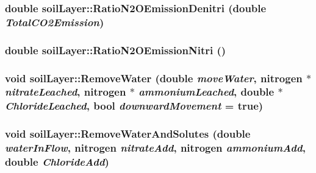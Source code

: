 \hypertarget{classsoil_layer_affc819f2895a9db557edc95966e56473}{
\subsubsection[{RatioN2OEmissionDenitri}]{\setlength{\rightskip}{0pt plus 5cm}double soilLayer::RatioN2OEmissionDenitri (double {\em TotalCO2Emission})}}
\label{classsoil_layer_affc819f2895a9db557edc95966e56473}
\hypertarget{classsoil_layer_a00af828149bbb4f4f7e1544bf75a33e3}{
\subsubsection[{RatioN2OEmissionNitri}]{\setlength{\rightskip}{0pt plus 5cm}double soilLayer::RatioN2OEmissionNitri ()}}
\label{classsoil_layer_a00af828149bbb4f4f7e1544bf75a33e3}
\hypertarget{classsoil_layer_a4043ef6ea471e4645efd82054aa78877}{
\subsubsection[{RemoveWater}]{\setlength{\rightskip}{0pt plus 5cm}void soilLayer::RemoveWater (double {\em moveWater}, \/  {\bf nitrogen} $\ast$ {\em nitrateLeached}, \/  {\bf nitrogen} $\ast$ {\em ammoniumLeached}, \/  double $\ast$ {\em ChlorideLeached}, \/  bool {\em downwardMovement} = {\ttfamily true})}}
\label{classsoil_layer_a4043ef6ea471e4645efd82054aa78877}
\hypertarget{classsoil_layer_aa3c2588bb518594ccb63a7004bc823d4}{
\subsubsection[{RemoveWaterAndSolutes}]{\setlength{\rightskip}{0pt plus 5cm}void soilLayer::RemoveWaterAndSolutes (double {\em waterInFlow}, \/  {\bf nitrogen} {\em nitrateAdd}, \/  {\bf nitrogen} {\em ammoniumAdd}, \/  double {\em ChlorideAdd})}}
